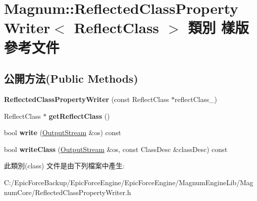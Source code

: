 \hypertarget{class_magnum_1_1_reflected_class_property_writer}{}\section{Magnum\+:\+:Reflected\+Class\+Property\+Writer$<$ Reflect\+Class $>$ 類別 樣版 參考文件}
\label{class_magnum_1_1_reflected_class_property_writer}
\subsection*{公開方法(Public Methods)}
\begin{DoxyCompactItemize}
\item 
{\bfseries Reflected\+Class\+Property\+Writer} (const Reflect\+Class $\ast$reflect\+Class\+\_\+)\hypertarget{class_magnum_1_1_reflected_class_property_writer_aa30aa2bdae78cbec6174df9f10edfb1c}{}\label{class_magnum_1_1_reflected_class_property_writer_aa30aa2bdae78cbec6174df9f10edfb1c}

\item 
Reflect\+Class $\ast$ {\bfseries get\+Reflect\+Class} ()\hypertarget{class_magnum_1_1_reflected_class_property_writer_a1b4c1dd6f738342bb266b7b731adf7b7}{}\label{class_magnum_1_1_reflected_class_property_writer_a1b4c1dd6f738342bb266b7b731adf7b7}

\item 
bool {\bfseries write} (\hyperlink{class_magnum_1_1_output_stream}{Output\+Stream} \&os) const \hypertarget{class_magnum_1_1_reflected_class_property_writer_ae924eb07572986fc0975dfb36f938d48}{}\label{class_magnum_1_1_reflected_class_property_writer_ae924eb07572986fc0975dfb36f938d48}

\item 
bool {\bfseries write\+Class} (\hyperlink{class_magnum_1_1_output_stream}{Output\+Stream} \&os, const Class\+Desc \&class\+Desc) const \hypertarget{class_magnum_1_1_reflected_class_property_writer_aa8f6899f5ff1dd34da6873539f304193}{}\label{class_magnum_1_1_reflected_class_property_writer_aa8f6899f5ff1dd34da6873539f304193}

\end{DoxyCompactItemize}


此類別(class) 文件是由下列檔案中產生\+:\begin{DoxyCompactItemize}
\item 
C\+:/\+Epic\+Force\+Backup/\+Epic\+Force\+Engine/\+Epic\+Force\+Engine/\+Magnum\+Engine\+Lib/\+Magnum\+Core/Reflected\+Class\+Property\+Writer.\+h\end{DoxyCompactItemize}
